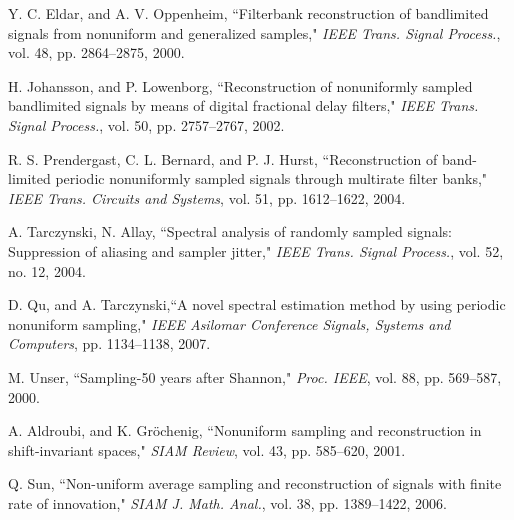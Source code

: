 \documentclass{UCF_ETD}
\begin{document}
\begin{thebibliography}{99}
Y. C. Eldar, and A. V. Oppenheim, ``Filterbank reconstruction of bandlimited signals from nonuniform and generalized samples,"  \emph{IEEE Trans. Signal Process.}, vol. 48, pp. 2864--2875, 2000.

H. Johansson, and P. Lowenborg, ``Reconstruction of nonuniformly sampled bandlimited signals by means of digital fractional delay filters," \emph{IEEE Trans. Signal Process.}, vol. 50, pp. 2757--2767, 2002.

R. S. Prendergast, C. L. Bernard, and P. J. Hurst, ``Reconstruction of band-limited periodic nonuniformly sampled signals through multirate filter banks," \emph{IEEE Trans. Circuits and Systems}, vol. 51, pp. 1612--1622, 2004.

A. Tarczynski, N. Allay, ``Spectral analysis of randomly sampled signals: Suppression of aliasing and sampler jitter," \emph{IEEE Trans. Signal Process.}, vol. 52, no. 12,  2004.

D. Qu, and A. Tarczynski,``A novel spectral estimation method by using periodic nonuniform sampling," \emph{IEEE Asilomar Conference Signals, Systems and Computers},  pp. 1134--1138, 2007.


 M. Unser,  ``Sampling-50 years after Shannon," {\em Proc. IEEE}, {vol. 88}, pp. 569--587, 2000.


A. Aldroubi, and K. Gr\"ochenig, ``Nonuniform sampling and reconstruction in shift-invariant spaces," {\em  SIAM Review}, vol. 43, pp. 585--620, 2001.


Q. Sun, ``Non-uniform average sampling and reconstruction of signals with finite rate of innovation," {\em SIAM J. Math. Anal.}, { vol. 38}, pp. 1389--1422, 2006.

%





\end{thebibliography}
\end{document}
